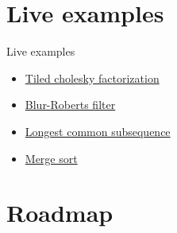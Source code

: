 \documentclass{beamer}
\begin{document}
\section{Live examples}

\begin{frame}{Live examples}
  \begin{itemize} 
    \item \href{https://maltezfaria.github.io/DataFlowTasks.jl/dev/examples/cholesky/cholesky/}{Tiled cholesky factorization}
    \item
    \href{https://maltezfaria.github.io/DataFlowTasks.jl/dev/examples/blur-roberts/blur-roberts/}{Blur-Roberts filter}
    \item
    \href{https://maltezfaria.github.io/DataFlowTasks.jl/dev/examples/lcs/lcs/}{Longest
    common subsequence}
    \item
    \href{https://maltezfaria.github.io/DataFlowTasks.jl/dev/examples/sort/sort/}{Merge sort}
  \end{itemize}
\end{frame}

\section{Roadmap}
\end{document}
